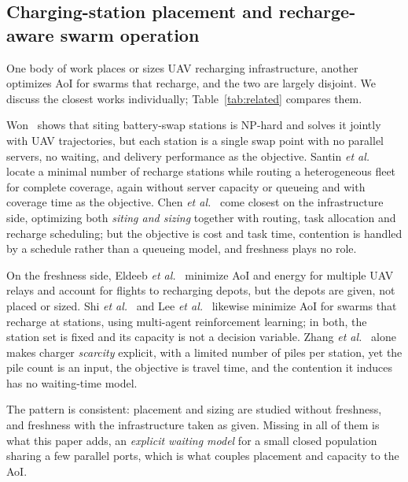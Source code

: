 \subsection{Charging-station placement and recharge-aware swarm operation}
\label{sec:rel-placement}

One body of work places or sizes UAV recharging infrastructure, another optimizes AoI
for swarms that recharge, and the two are largely disjoint. We discuss the closest
works individually; Table~\ref{tab:related} compares them.

Won~\cite{won2020ubat} shows that siting battery-swap stations is NP-hard and solves
it jointly with UAV trajectories, but each station is a single swap point with no
parallel servers, no waiting, and delivery performance as the objective.
Santin \emph{et al.}~\cite{santin2021matheur} locate a minimal number of recharge
stations while routing a heterogeneous fleet for complete coverage, again without
server capacity or queueing and with coverage time as the objective. Chen \emph{et
al.}~\cite{chen2024ev} come closest on the infrastructure side, optimizing both
\emph{siting and sizing} together with routing, task allocation and recharge
scheduling; but the objective is cost and task time, contention is handled by a
schedule rather than a queueing model, and freshness plays no role.

On the freshness side, Eldeeb \emph{et al.}~\cite{eldeeb2022recharge} minimize AoI and
energy for multiple UAV relays and account for flights to recharging depots, but the
depots are given, not placed or sized. Shi \emph{et al.}~\cite{shi2025aoi}
and Lee \emph{et al.}~\cite{lee2024madrl} likewise minimize AoI for swarms that
recharge at stations, using multi-agent reinforcement learning; in both, the station
set is fixed and its capacity is not a decision variable. Zhang \emph{et al.}~\cite{zhang2023deploy} alone makes charger \emph{scarcity}
explicit, with a limited number of piles per station, yet the pile count is an input,
the objective is travel time, and the contention it induces has no waiting-time model.

The pattern is consistent: placement and sizing are studied without freshness, and
freshness with the infrastructure taken as given. Missing in all of them is what this
paper adds, an \emph{explicit waiting model} for a small closed population sharing a
few parallel ports, which is what couples placement and capacity to the AoI.

